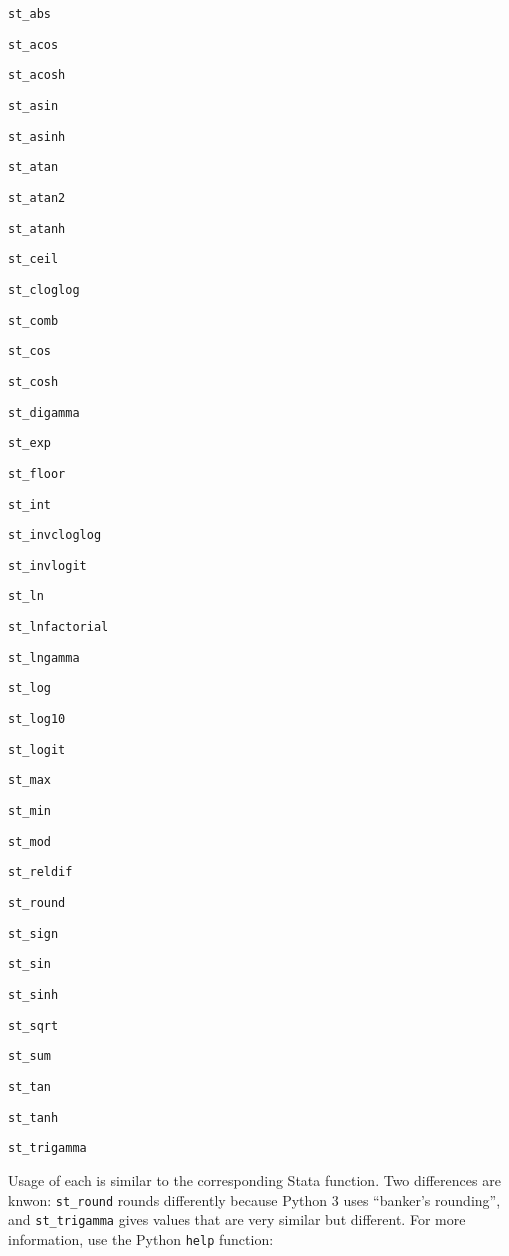 \documentclass{article}
\begin{document}
\begin{multicols}{3}
\setcounter{finalcolumnbadness}{0}

\lstinline$st_abs$

\lstinline$st_acos$

\lstinline$st_acosh$

\lstinline$st_asin$

\lstinline$st_asinh$

\lstinline$st_atan$

\lstinline$st_atan2$

\lstinline$st_atanh$

\lstinline$st_ceil$

\lstinline$st_cloglog$

\lstinline$st_comb$

\lstinline$st_cos$

\lstinline$st_cosh$

\lstinline$st_digamma$

\lstinline$st_exp$

\lstinline$st_floor$

\lstinline$st_int$

\lstinline$st_invcloglog$

\lstinline$st_invlogit$

\lstinline$st_ln$

\lstinline$st_lnfactorial$

\lstinline$st_lngamma$

\lstinline$st_log$

\lstinline$st_log10$

\lstinline$st_logit$

\lstinline$st_max$

\lstinline$st_min$

\lstinline$st_mod$

\lstinline$st_reldif$

\lstinline$st_round$

\lstinline$st_sign$
         
\lstinline$st_sin$

\lstinline$st_sinh$

\lstinline$st_sqrt$

\lstinline$st_sum$

\lstinline$st_tan$

\lstinline$st_tanh$

\lstinline$st_trigamma$

\end{multicols}

Usage of each is similar to the corresponding Stata function. Two differences are knwon: \lstinline{st_round} rounds differently because Python 3 uses ``banker's rounding'', and \lstinline{st_trigamma} gives values that are very similar but different. For more information, use the Python \lstinline{help} function:
\end{document}

